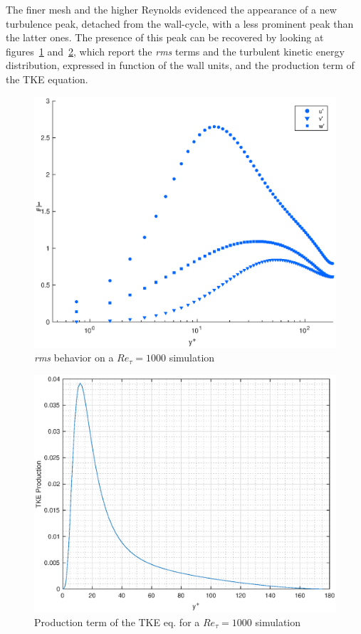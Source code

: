 The finer mesh and the higher Reynolds evidenced the appearance of a new turbulence peak, detached from the wall-cycle, with a less prominent peak than the latter ones. The presence of this peak can be recovered by looking at figures~\ref{rms:1000} and~\ref{tke:prod:1000}, which report the \emph{rms} terms and the turbulent kinetic energy distribution, expressed in function of the wall units, and the production term of the TKE equation.  

\begin{figure}
\begin{center}
\includegraphics[scale=0.55]{grafici/rms_1000.eps}
\caption{\emph{rms} behavior on a $Re_{\tau}=1000$ simulation}
\label{rms:1000}
\end{center} 
\end{figure}

\begin{figure}
\begin{center}
\includegraphics[scale=0.55]{grafici/tke_prod_1000.eps}
\caption{Production term of the TKE eq. for a $Re_{\tau}=1000$ simulation}
\label{tke:prod:1000}
\end{center} 
\end{figure}